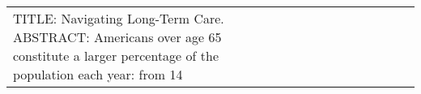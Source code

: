 \begin{longtable}{llllllllllllll}
\bottomrule
\endlastfoot
TITLE: Navigating Long-Term Care. ABSTRACT: Americans over age 65 constitute a larger percentage of the population each year: from 14%

\end{longtable}
